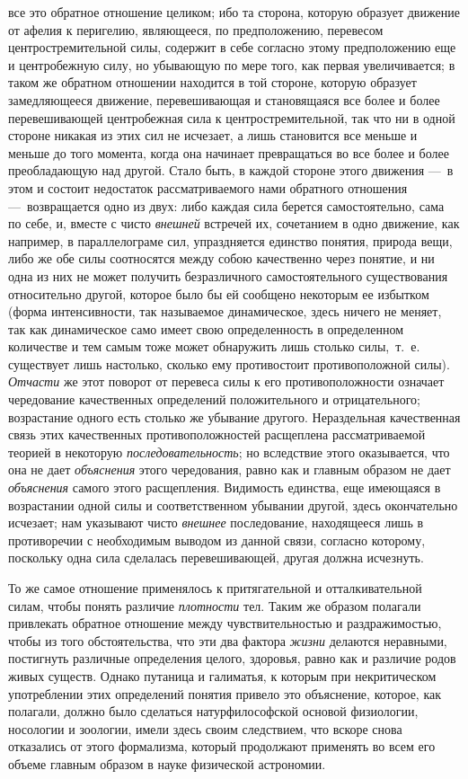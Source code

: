 все это обратное отношение целиком; ибо та сторона, которую образует
движение от афелия к перигелию, являющееся, по предположению, перевесом
центростремительной силы, содержит в себе согласно этому предположению еще
и центробежную силу, но убывающую по мере того, как первая увеличивается; в
таком же обратном отношении находится в той стороне, которую образует
замедляющееся движение, перевешивающая и становящаяся все более и более
перевешивающей центробежная сила к центростремительной, так что ни в одной
стороне никакая из этих сил не исчезает, а лишь становится все меньше и
меньше до того момента, когда она начинает превращаться во все более и
более преобладающую над другой. Стало быть, в каждой стороне этого движения
—~в этом и состоит недостаток рассматриваемого нами обратного отношения
—~возвращается одно из двух: либо каждая сила берется самостоятельно, сама
по себе, и, вместе с чисто {\em внешней} встречей их,
сочетанием в одно движение, как например, в параллелограме сил,
упраздняется единство понятия, природа вещи, либо же обе силы соотносятся
между собою качественно через понятие, и ни одна из них не может получить
безразличного самостоятельного существования относительно другой, которое
было бы ей сообщено некоторым ее избытком (форма интенсивности, так
называемое динамическое, здесь ничего не меняет, так как динамическое само
имеет свою определенность в определенном количестве и тем самым тоже может
обнаружить лишь столько силы,~т.~е. существует лишь настолько, сколько ему
противостоит противоположной силы). {\em Отчасти} же
этот поворот от перевеса силы к его противоположности означает чередование
качественных определений положительного и отрицательного; возрастание
одного есть столько же убывание другого. Нераздельная качественная связь
этих качественных противоположностей расщеплена рассматриваемой теорией в
некоторую {\em последовательность}; но вследствие этого
оказывается, что она не дает {\em объяснения} этого
чередования, равно как и главным образом не дает
{\em объяснения} самого этого расщепления. Видимость
единства, еще имеющаяся в возрастании одной силы и соответственном убывании
другой, здесь окончательно исчезает; нам указывают чисто
{\em внешнее} последование, находящееся лишь в
противоречии с необходимым выводом из данной связи, согласно которому,
поскольку одна сила сделалась перевешивающей, другая должна исчезнуть.

То же самое отношение применялось к притягательной и отталкивательной силам,
чтобы понять различие {\em плотности} тел. Таким же
образом полагали привлекать обратное отношение между чувствительностью и
раздражимостью, чтобы из того обстоятельства, что эти два фактора
{\em жизни} делаются неравными, постигнуть различные
определения целого, здоровья, равно как и различие родов живых существ.
Однако путаница и галиматья, к которым при некритическом употреблении этих
определений понятия привело это объяснение, которое, как полагали, должно
было сделаться натурфилософской основой физиологии, носологии и зоологии,
имели здесь своим следствием, что вскоре снова отказались от этого
формализма, который продолжают применять во всем его объеме главным образом
в науке физической астрономии.

